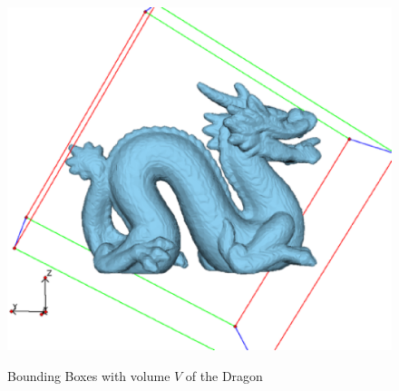 \documentclass[a4paper,10pt,notitlepage]{scrreprt}
\begin{document}
\begin{figure}
{    \includegraphics[scale=0.4]{bbox-v3-dragon.eps}}
 \caption{Bounding Boxes with volume $V$ of the Dragon}
 \label{fig:bbox-dragon}
\end{figure}
\end{document}
